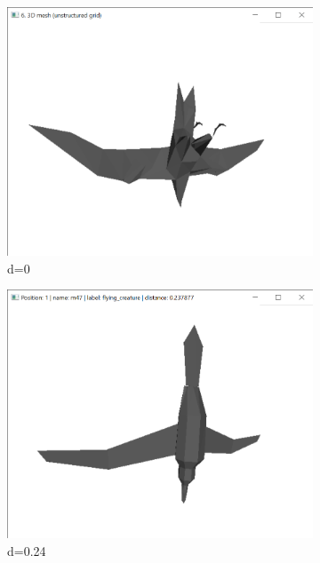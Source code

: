 \documentclass{bigdata}
\begin{document}
\begin{figure}[h!]
  \centering
  \begin{subfigure}[b]{0.09\linewidth}
    \includegraphics[width=\linewidth]{Pictures/Evaluation/m42/m42.png}
    \caption*{d=0}
  \end{subfigure}
  \begin{subfigure}[b]{0.09\linewidth}
    \includegraphics[width=\linewidth]{Pictures/Evaluation/m42/pos1.png}
    \caption*{d=0.24}
  \end{subfigure}
  \begin{subfigure}[b]{0.09\linewidth}

\end{subfigure}
\end{figure}
\end{document}
